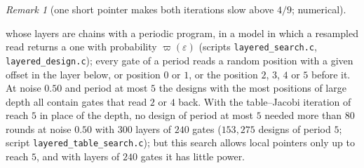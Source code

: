 \documentclass[11pt]{amsart}
\theoremstyle{definition}
\theoremstyle{remark}
\newtheorem{remark}[theorem]{Remark}
\newcommand{\eps}{\varepsilon}
\begin{document}
\begin{remark}[one short pointer makes both iterations slow above $4/9$; numerical]
\begin{enumerate}[label=(\roman*),leftmargin=2.4em]
whose layers are chains with a periodic program, in a model in which a resampled read returns a
one with probability $\varpi(\eps)$ (scripts \texttt{layered\_search.c},
\texttt{layered\_design.c}); every gate of a period reads a random position with a given offset
in the layer below, or position $0$ or $1$, or the position $2$, $3$, $4$ or $5$ before it. At
noise $0.50$ and period at most $5$ the designs with the most positions of large depth all
contain gates that read $2$ or $4$ back. With the table--Jacobi iteration of reach $5$ in place
of the depth, no design of period at most $5$ needed more than $80$ rounds at noise $0.50$ with
$300$ layers of $240$ gates ($153{,}275$ designs of period $5$; script
\texttt{layered\_table\_search.c}); but this search allows local pointers only up to reach $5$,
and with layers of $240$ gates it has little power.
\end{enumerate}
\end{remark}
\end{document}
